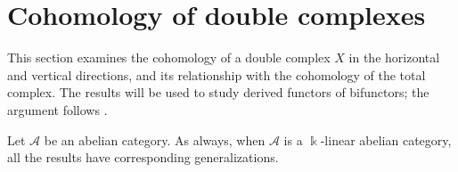 
\section{Cohomology of double complexes}\label{sec:double-cplx-coh}
\hypertarget{o014.aljabr2.chapter3.double-complex-cohomology}{ }

This section examines the cohomology of a double complex $X$ in the horizontal
and vertical directions, and its relationship with the cohomology of the total
complex. The results will be used to study derived functors of bifunctors; the
argument follows \cite[\S 12.5]{KS06}.

Let $\mathcal{A}$ be an abelian category. As always, when $\mathcal{A}$ is a
$\Bbbk$-linear abelian category, all the results have corresponding
generalizations.

